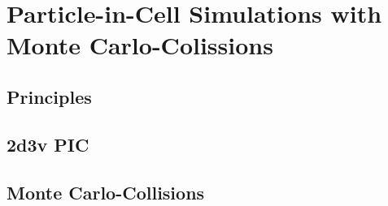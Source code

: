 %
	\section{Particle-in-Cell Simulations with Monte Carlo-Colissions}\label{sec:picsimulationmcc}
%
		\subsection{Principles}\label{sec:picbasics}
%
		\subsection{2d3v PIC}\label{sec:pic_2d3v}
%
		\subsection{Monte Carlo-Collisions}\label{sec:montecarlo}
%
